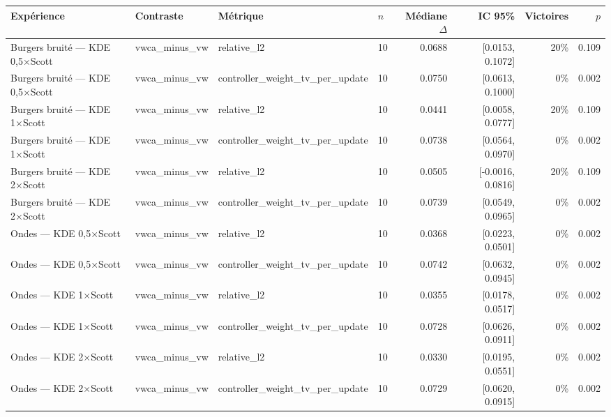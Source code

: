 \begin{tabular}{llllrrrr}
\toprule
Expérience & Contraste & Métrique & $n$ & Médiane $\Delta$ & IC 95\% & Victoires & $p$ \\
\midrule
Burgers bruité — KDE 0,5×Scott & vwca\_minus\_vw & relative\_l2 & 10 & 0.0688 & [0.0153, 0.1072] & 20\% & 0.109 \\
Burgers bruité — KDE 0,5×Scott & vwca\_minus\_vw & controller\_weight\_tv\_per\_update & 10 & 0.0750 & [0.0613, 0.1000] & 0\% & 0.002 \\
Burgers bruité — KDE 1×Scott & vwca\_minus\_vw & relative\_l2 & 10 & 0.0441 & [0.0058, 0.0777] & 20\% & 0.109 \\
Burgers bruité — KDE 1×Scott & vwca\_minus\_vw & controller\_weight\_tv\_per\_update & 10 & 0.0738 & [0.0564, 0.0970] & 0\% & 0.002 \\
Burgers bruité — KDE 2×Scott & vwca\_minus\_vw & relative\_l2 & 10 & 0.0505 & [-0.0016, 0.0816] & 20\% & 0.109 \\
Burgers bruité — KDE 2×Scott & vwca\_minus\_vw & controller\_weight\_tv\_per\_update & 10 & 0.0739 & [0.0549, 0.0965] & 0\% & 0.002 \\
Ondes — KDE 0,5×Scott & vwca\_minus\_vw & relative\_l2 & 10 & 0.0368 & [0.0223, 0.0501] & 0\% & 0.002 \\
Ondes — KDE 0,5×Scott & vwca\_minus\_vw & controller\_weight\_tv\_per\_update & 10 & 0.0742 & [0.0632, 0.0945] & 0\% & 0.002 \\
Ondes — KDE 1×Scott & vwca\_minus\_vw & relative\_l2 & 10 & 0.0355 & [0.0178, 0.0517] & 0\% & 0.002 \\
Ondes — KDE 1×Scott & vwca\_minus\_vw & controller\_weight\_tv\_per\_update & 10 & 0.0728 & [0.0626, 0.0911] & 0\% & 0.002 \\
Ondes — KDE 2×Scott & vwca\_minus\_vw & relative\_l2 & 10 & 0.0330 & [0.0195, 0.0551] & 0\% & 0.002 \\
Ondes — KDE 2×Scott & vwca\_minus\_vw & controller\_weight\_tv\_per\_update & 10 & 0.0729 & [0.0620, 0.0915] & 0\% & 0.002 \\
\bottomrule
\end{tabular}
